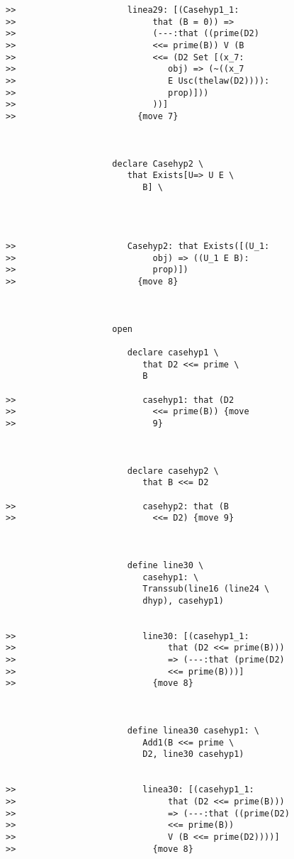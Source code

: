 \documentclass[12pt]{article}
\begin{document}
\begin{verbatim}
>>                      linea29: [(Casehyp1_1:
>>                           that (B = 0)) =>
>>                           (---:that ((prime(D2)
>>                           <<= prime(B)) V (B
>>                           <<= (D2 Set [(x_7:
>>                              obj) => (~((x_7
>>                              E Usc(thelaw(D2)))):
>>                              prop)]))
>>                           ))]
>>                        {move 7}



                     declare Casehyp2 \
                        that Exists[U=> U E \
                           B] \
                        



>>                      Casehyp2: that Exists([(U_1:
>>                           obj) => ((U_1 E B):
>>                           prop)])
>>                        {move 8}



                     open

                        declare casehyp1 \
                           that D2 <<= prime \
                           B

>>                         casehyp1: that (D2
>>                           <<= prime(B)) {move
>>                           9}



                        declare casehyp2 \
                           that B <<= D2

>>                         casehyp2: that (B
>>                           <<= D2) {move 9}



                        define line30 \
                           casehyp1: \
                           Transsub(line16 (line24 \
                           dhyp), casehyp1)


>>                         line30: [(casehyp1_1:
>>                              that (D2 <<= prime(B)))
>>                              => (---:that (prime(D2)
>>                              <<= prime(B)))]
>>                           {move 8}



                        define linea30 casehyp1: \
                           Add1(B <<= prime \
                           D2, line30 casehyp1)


>>                         linea30: [(casehyp1_1:
>>                              that (D2 <<= prime(B)))
>>                              => (---:that ((prime(D2)
>>                              <<= prime(B))
>>                              V (B <<= prime(D2))))]
>>                           {move 8}




\end{verbatim}
\end{document}

